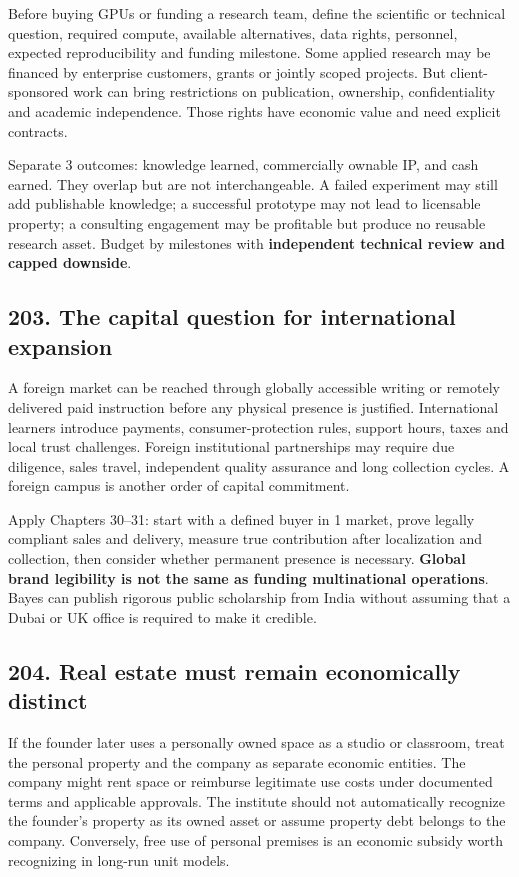 Before buying GPUs or funding a research team, define the scientific or technical question, required compute, available alternatives, data rights, personnel, expected reproducibility and funding milestone. Some applied research may be financed by enterprise customers, grants or jointly scoped projects. But client-sponsored work can bring restrictions on publication, ownership, confidentiality and academic independence. Those rights have economic value and need explicit contracts.

Separate 3 outcomes: knowledge learned, commercially ownable IP, and cash earned. They overlap but are not interchangeable. A failed experiment may still add publishable knowledge; a successful prototype may not lead to licensable property; a consulting engagement may be profitable but produce no reusable research asset. Budget by milestones with \textbf{independent technical review and capped downside}.

\subsection{203. The capital question for international expansion}


A foreign market can be reached through globally accessible writing or remotely delivered paid instruction before any physical presence is justified. International learners introduce payments, consumer-protection rules, support hours, taxes and local trust challenges. Foreign institutional partnerships may require due diligence, sales travel, independent quality assurance and long collection cycles. A foreign campus is another order of capital commitment.

Apply Chapters 30–31: start with a defined buyer in 1 market, prove legally compliant sales and delivery, measure true contribution after localization and collection, then consider whether permanent presence is necessary. \textbf{Global brand legibility is not the same as funding multinational operations}. Bayes can publish rigorous public scholarship from India without assuming that a Dubai or UK office is required to make it credible.

\subsection{204. Real estate must remain economically distinct}


If the founder later uses a personally owned space as a studio or classroom, treat the personal property and the company as separate economic entities. The company might rent space or reimburse legitimate use costs under documented terms and applicable approvals. The institute should not automatically recognize the founder's property as its owned asset or assume property debt belongs to the company. Conversely, free use of personal premises is an economic subsidy worth recognizing in long-run unit models.

